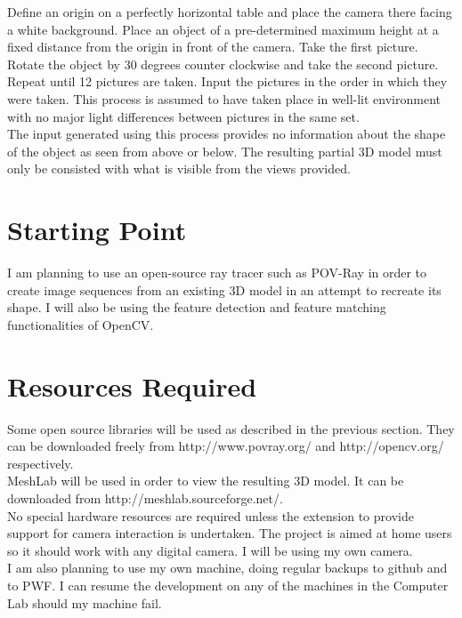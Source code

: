 Define an origin on a perfectly horizontal table and place the camera there facing a white background. Place an object of a pre-determined maximum height at a fixed distance from the origin in front of the camera. Take the first picture. Rotate the object by 30 degrees counter clockwise and take the second picture. Repeat until 12 pictures are taken. Input the pictures in the order in which they were taken. This process is assumed to have taken place in well-lit environment with no major light differences between pictures in the same set.\\
The input generated using this process provides no information about the shape of the object as seen from above or below. The resulting partial 3D model must only be consisted with what is visible from the views provided.

\section*{Starting Point}
I am planning to use an open-source ray tracer such as POV-Ray in order to create image sequences from an existing 3D model in an attempt to recreate its shape. I will also be using the feature detection and feature matching functionalities of OpenCV.

\section*{Resources Required}
Some open source libraries will be used as described in the previous section. They can be downloaded freely from http://www.povray.org/ and http://opencv.org/ respectively.\\
MeshLab will be used in order to view the resulting 3D model. It can be downloaded from http://meshlab.sourceforge.net/.\\

No special hardware resources are required unless the extension to provide support for camera interaction is undertaken. The project is aimed at home users so it should work with any digital camera. I will be using my own camera.\\

I am also planning to use my own machine, doing regular backups to github and to PWF. I can resume the development on any of the machines in the Computer Lab should my machine fail. 

